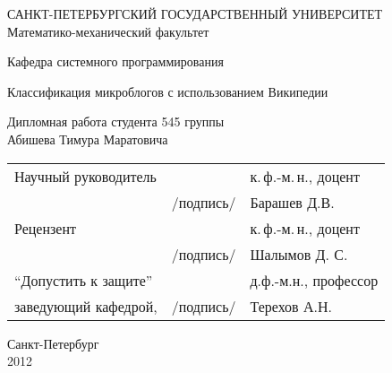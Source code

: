 \documentclass[specialist,subf,href,colorlinks=true
]{disser}
\begin{document}
%
%
\thispagestyle{empty}
\begin{center}
САНКТ-ПЕТЕРБУРГСКИЙ ГОСУДАРСТВЕННЫЙ УНИВЕРСИТЕТ\\
Математико-механический факультет\\
\end{center}
\begin{center}
Кафедра системного программирования\\
\end{center}
\vspace{2cm}
\begin{center}
    \Large{Классификация микроблогов с использованием Википедии} \\
\end{center}
\vspace{1cm}
\begin{center}
    \normalsize{Дипломная работа студента 545 группы} \\
    \large{Абишева Тимура Маратовича}
\end{center}
\vspace{3cm}
\noindent
\begin{center}
    \small
    \begin{tabular}{lcl}
        Научный руководитель & \dotuline{\phantom{кошерная подпись}} & к.\,ф.-м.\,н., доцент\\
        & /подпись/ & Барашев Д.В.\\
        Рецензент & \dotuline{\phantom{кошерная подпись}} & к.\,ф.-м.\,н., доцент\\
        & /подпись/&  Шалымов Д. С. \\
        ``Допустить к защите'' & \dotuline{\phantom{кошерная подпись}} & д.ф.-м.н., профессор\\
        заведующий кафедрой, & /подпись/& Терехов А.Н.\\
    \end{tabular}
\end{center}
\vspace{\fill}
\begin{center}
    \small
    Санкт-Петербург\\2012
\end{center}
\pagebreak
\end{document}
